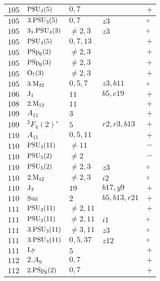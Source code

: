 \documentclass[a4paper, 11pt]{article}
\begin{document}
\begin{longtable}{lllll}
		$105$ & ${\rm PSU}_{3}(5)$ & $0,7$ &  & $+$ \\ \hline
		$105$ & $3.{\rm PSU}_{3}(5)$ & $0,7$ & $z3$ & $\circ$ \\ \hline
		$105$ & $3_1.{\rm PSU}_{4}(3)$ & $\neq 2,3$ & $z3$ & $\circ$ \\ \hline
		$105$ & ${\rm PSU}_{4}(5)$ & $0,7,13$ &  & $+$ \\ \hline
		$105$ & ${\rm PSp}_{6}(2)$ & $\neq 2,3$ &  & $+$ \\ \hline
		$105$ & ${\rm PSp}_{6}(3)$ & $\neq 2,3$ &  & $+$ \\ \hline
		$105$ & ${\rm O}_{7}(3)$ & $\neq 2,3$ &  & $+$ \\ \hline
		$105$ & $3.{\rm M}_{22}$ & $0,5,7$ & $z3, b11$ & $\circ$ \\ \hline
		$106$ & ${\rm J}_1$ & $11$ & $b5, c19$ & $+$ \\ \hline
		$108$ & $2.{\rm M}_{12}$ & $11$ &  & $+$ \\ \hline
		$109$ & $A_{11}$ & $3$ &  & $+$ \\ \hline
		$109$ & ${}^{2}F_{4}(2)'$ & $5$ & $r2, r3, b13$ & $+$ \\ \hline
		$110$ & $A_{11}$ & $0,5,11$ &  & $+$ \\ \hline
		$110$ & ${\rm PSU}_{3}(11)$ & $\neq 11$ &  & $-$ \\ \hline
		$110$ & ${\rm PSU}_{5}(2)$ & $\neq 2$ &  & $-$ \\ \hline
		$110$ & ${\rm PSU}_{5}(2)$ & $\neq 2,3$ & $z3$ & $\circ$ \\ \hline
		$110$ & $2.{\rm M}_{12}$ & $\neq 2,3$ & $i2$ & $\circ$ \\ \hline
		$110$ & ${\rm J}_3$ & $19$ & $b17, y9$ & $+$ \\ \hline
		$110$ & ${\rm Suz}$ & $2$ & $b5, b13, r21$ & $+$ \\ \hline
		$111$ & ${\rm PSU}_{3}(11)$ & $\neq 2,11$ &  & $+$ \\ \hline
		$111$ & ${\rm PSU}_{3}(11)$ & $\neq 2,11$ & $i1$ & $\circ$ \\ \hline
		$111$ & $3.{\rm PSU}_{3}(11)$ & $\neq 3,11$ & $z3$ & $\circ$ \\ \hline
		$111$ & $3.{\rm PSU}_{3}(11)$ & $0,5,37$ & $z12$ & $\circ$ \\ \hline
		$111$ & ${\rm Ly}$ & $5$ &  & $+$ \\ \hline
		$112$ & $2.A_{9}$ & $0,7$ &  & $+$ \\ \hline
		$112$ & $2.{\rm PSp}_{6}(2)$ & $0,7$ &  & $+$ \\ \hline

\end{longtable}
\end{document}

